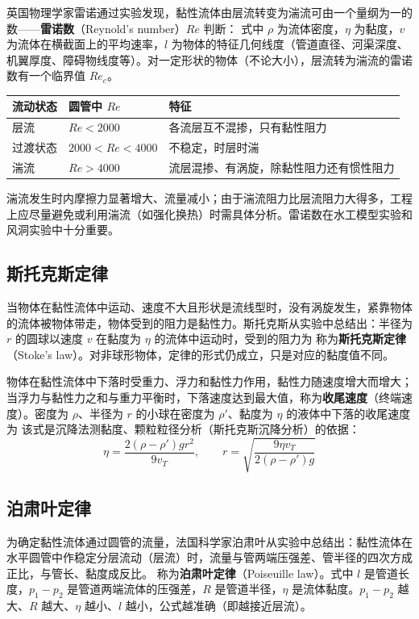     英国物理学家雷诺通过实验发现，黏性流体由层流转变为湍流可由一个量纲为一的数——\textbf{雷诺数}（Reynold's number）$Re$ 判断：
    式中 $\rho$ 为流体密度，$\eta$ 为黏度，$v$ 为流体在横截面上的平均速率，$l$ 为物体的特征几何线度（管道直径、河渠深度、机翼厚度、障碍物线度等）。对一定形状的物体（不论大小），层流转为湍流的雷诺数有一个临界值 $Re_{c}$。

    \begin{center}
    \begin{tabular}{lll}
    \toprule
    流动状态 & 圆管中 $Re$ & 特征 \\
    \midrule
    层流 & $Re<2000$ & 各流层互不混掺，只有黏性阻力 \\
    过渡状态 & $2000<Re<4000$ & 不稳定，时层时湍 \\
    湍流 & $Re>4000$ & 流层混掺、有涡旋，除黏性阻力还有惯性阻力 \\
    \bottomrule
    \end{tabular}
    \end{center}
    湍流发生时内摩擦力显著增大、流量减小；由于湍流阻力比层流阻力大得多，工程上应尽量避免或利用湍流（如强化换热）时需具体分析。雷诺数在水工模型实验和风洞实验中十分重要。

    \subsection{斯托克斯定律}
    当物体在黏性流体中运动、速度不大且形状是流线型时，没有涡旋发生，紧靠物体的流体被物体带走，物体受到的阻力是黏性力。斯托克斯从实验中总结出：半径为 $r$ 的圆球以速度 $v$ 在黏度为 $\eta$ 的流体中运动时，受到的阻力为
    称为\textbf{斯托克斯定律}（Stoke's law）。对非球形物体，定律的形式仍成立，只是对应的黏度值不同。

    物体在黏性流体中下落时受重力、浮力和黏性力作用，黏性力随速度增大而增大；当浮力与黏性力之和与重力平衡时，下落速度达到最大值，称为\textbf{收尾速度}（终端速度）。密度为 $\rho$、半径为 $r$ 的小球在密度为 $\rho'$、黏度为 $\eta$ 的液体中下落的收尾速度为
    该式是沉降法测黏度、颗粒粒径分析（斯托克斯沉降分析）的依据：
    \[
    \eta=\frac{2\left(\rho-\rho'\right)gr^{2}}{9v_{T}},
    \qquad
    r=\sqrt{\frac{9\eta v_{T}}{2\left(\rho-\rho'\right)g}}
    \]

    \subsection{泊肃叶定律}
    为确定黏性流体通过圆管的流量，法国科学家泊肃叶从实验中总结出：黏性流体在水平圆管中作稳定分层流动（层流）时，流量与管两端压强差、管半径的四次方成正比，与管长、黏度成反比。
    称为\textbf{泊肃叶定律}（Poiseuille law）。式中 $l$ 是管道长度，$p_{1}-p_{2}$ 是管道两端流体的压强差，$R$ 是管道半径，$\eta$ 是流体黏度。$p_{1}-p_{2}$ 越大、$R$ 越大、$\eta$ 越小、$l$ 越小，公式越准确（即越接近层流）。

